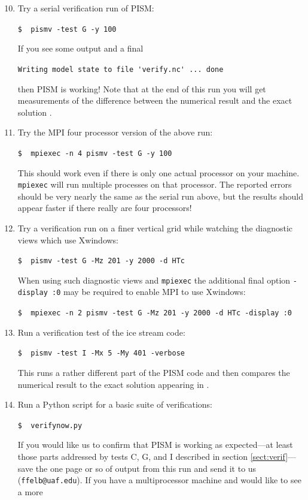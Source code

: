 \documentclass[12pt,final]{amsart}
\begin{document}
\begin{enumerate}\setcounter{enumi}{9}
\item \label{serialpismvrun} Try a serial verification run of PISM:

\verb|$  pismv -test G -y 100|

\noindent If you see some output and a final 

\verb|Writing model state to file 'verify.nc' ... done|

\noindent then PISM is working!  Note that at the end of this run you will get measurements of the difference between the numerical result and the exact solution \cite{BBL}.

\item Try the MPI four processor version of the above run:

\verb|$  mpiexec -n 4 pismv -test G -y 100|

\noindent This should work even if there is only one actual processor on your machine.  \verb|mpiexec| will run multiple processes on that processor.  The reported errors should be very nearly the same as the serial run above, but the results should appear faster if there really are four processors!

\item Try a verification run on a finer vertical grid while watching the diagnostic views which use Xwindows:

\verb|$  pismv -test G -Mz 201 -y 2000 -d HTc|

\noindent When using such diagnostic views and \verb|mpiexec| the additional final option \verb|-display :0| may be required to enable MPI to use Xwindows:

\verb|$  mpiexec -n 2 pismv -test G -Mz 201 -y 2000 -d HTc -display :0|

\item Run a verification test of the ice stream code:

\verb|$  pismv -test I -Mx 5 -My 401 -verbose|

\noindent This runs a rather different part of the PISM code and then compares the numerical result to the exact solution appearing in \cite{SchoofStream}.

\item Run a Python script for a basic suite of verifications:

\verb|$  verifynow.py|

\noindent If you would like us to confirm that PISM is working as expected---at least those parts addressed by tests C, G, and I described in section \ref{sect:verif}---save the one page or so of output from this run and send it to us (\verb|ffelb@uaf.edu|).  If you have a multiprocessor machine and would like to see a more 
\end{enumerate}
\bigskip
\end{document}
